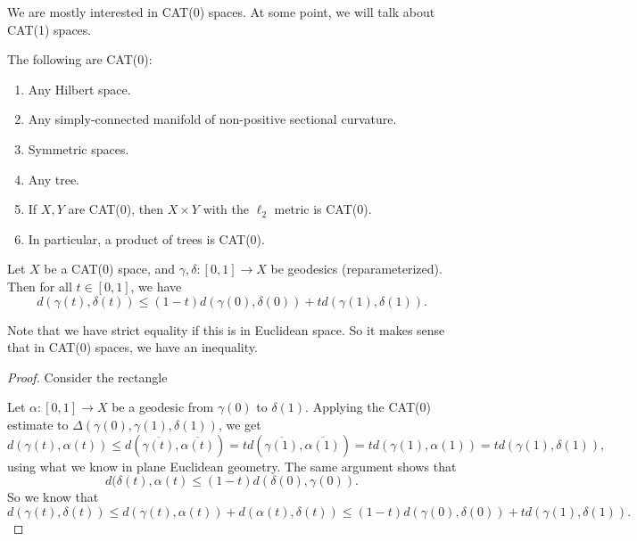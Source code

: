 \documentclass[a4paper]{article}
\begin{document}
We are mostly interested in CAT(0) spaces. At some point, we will talk about CAT(1) spaces.

\begin{eg}
  The following are CAT(0):
  \begin{enumerate}
    \item Any Hilbert space.
    \item Any simply-connected manifold of non-positive sectional curvature.
    \item Symmetric spaces.
    \item Any tree.
    \item If $X, Y$ are CAT(0), then $X \times Y$ with the $\ell_2$ metric is CAT(0).
    \item In particular, a product of trees is CAT(0).
  \end{enumerate}
\end{eg}

\begin{lemma}
  Let $X$ be a CAT(0) space, and $\gamma, \delta: [0, 1] \to X$ be geodesics (reparameterized). Then for all $t \in [0, 1]$, we have
  \[
    d(\gamma(t), \delta(t)) \leq (1 - t) d(\gamma(0), \delta(0)) + t d(\gamma(1), \delta(1)).
  \]
\end{lemma}
Note that we have strict equality if this is in Euclidean space. So it makes sense that in CAT(0) spaces, we have an inequality.
\begin{proof}
  Consider the rectangle
  \begin{center}
  \end{center}
  Let $\alpha: [0, 1] \to X$ be a geodesic from $\gamma(0)$ to $\delta(1)$. Applying the CAT(0) estimate to $\Delta(\gamma(0), \gamma(1), \delta(1))$, we get
  \[
    d(\gamma(t), \alpha(t)) \leq d(\overline{\gamma(t)}, \overline{\alpha(t)}) = t d(\overline{\gamma(1)}, \overline{\alpha(1)}) = t d(\gamma(1), \alpha(1)) = t d(\gamma(1), \delta(1)),
  \]
  using what we know in plane Euclidean geometry. The same argument shows that
  \[
    d(\delta(t), \alpha(t) \leq (1 - t) d(\delta(0), \gamma(0)).
  \]
  So we know that
  \[
    d(\gamma(t), \delta(t)) \leq d(\gamma(t), \alpha(t)) + d(\alpha(t), \delta(t)) \leq (1 - t) d(\gamma(0), \delta(0)) + t d(\gamma(1), \delta(1)).
  \]
\end{proof}
\end{document}
